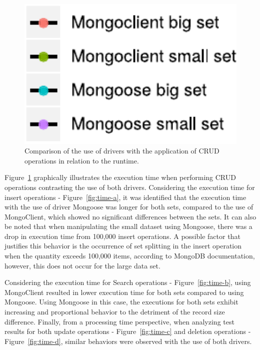 \documentclass{svproc}
\begin{document}
\begin{figure}[!ht]
{\begin{minipage}[1\width]{0.15\textwidth}
            \includegraphics[width=1\textwidth]{images/legend.pdf}
        \end{minipage}} 
    \caption{Comparison of the use of drivers with the application of CRUD operations in relation to the runtime.}
    \label{fig:time}
\end{figure}

Figure~\ref{fig:time} graphically illustrates the execution time when performing CRUD operations contrasting the use of both drivers. Considering the execution time for insert operations - Figure~\ref{fig:time-a}, it was identified that the execution time with the use of driver Mongoose was longer for both sets, compared to the use of MongoClient, which showed no significant differences between the sets. It can also be noted that when manipulating the small dataset using Mongoose, there was a drop in execution time from 100,000 insert operations. A possible factor that justifies this behavior is the occurrence of set splitting in the insert operation when the quantity exceeds 100,000 items, according to MongoDB documentation, however, this does not occur for the large data set.

Considering the execution time for Search operations - Figure~\ref{fig:time-b}, using MongoClient resulted in lower execution time for both sets compared to using Mongoose. Using Mongoose in this case, the executions for both sets exhibit increasing and proportional behavior to the detriment of the record size difference. Finally, from a processing time perspective, when analyzing test results for both update operations - Figure~\ref{fig:time-c} and deletion operations - Figure~\ref{fig:time-d}, similar behaviors were observed with the use of both drivers.
\end{document}
